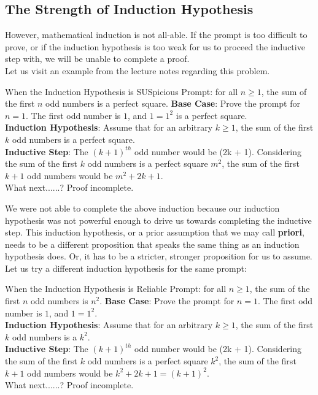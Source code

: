 \subsection{The Strength of Induction Hypothesis}
However, mathematical induction is not all-able. If the prompt is too difficult to prove, or if the induction hypothesis is too weak for us to proceed the inductive step with, we will be unable to complete a proof. \\
Let us visit an example from the lecture notes regarding this problem.
\begin{ln-think}{When the Induction Hypothesis is SUSpicious}{}
    Prompt: for all $n \geq 1$, the sum of the first $n$ odd numbers is a perfect square.
    \tcblower
    \textbf{Base Case}: Prove the prompt for $n = 1$. The first odd number is $1$, and $1 = 1 ^ 2$ is a perfect square. \\
    \textbf{Induction Hypothesis}: Assume that for an arbitrary $k \geq 1$, the sum of the first $k$ odd numbers is a perfect square. \\
    \textbf{Inductive Step}: The $(k + 1)^{th}$ odd number would be (2k + 1). Considering the sum of the first $k$ odd numbers is a perfect square $m^2$, the sum of the first $k + 1$ odd numbers would be $m^2 + 2k + 1$. \\
    What next......? Proof incomplete.
\end{ln-think}
We were not able to complete the above induction because our induction hypothesis was not powerful enough to drive us towards completing the inductive step. This induction hypothesis, or a prior assumption that we may call \textbf{priori}, needs to be a different proposition that speaks the same thing as an induction hypothesis does. Or, it has to be a stricter, stronger proposition for us to assume. \\
Let us try a different induction hypothesis for the same prompt:
\begin{ln-think}{When the Induction Hypothesis is Reliable}{}
    Prompt: for all $n \geq 1$, the sum of the first $n$ odd numbers is $n^2$.
    \tcblower
    \textbf{Base Case}: Prove the prompt for $n = 1$. The first odd number is $1$, and $1 = 1 ^ 2$. \\
    \textbf{Induction Hypothesis}: Assume that for an arbitrary $k \geq 1$, the sum of the first $k$ odd numbers is a $k ^ 2$. \\
    \textbf{Inductive Step}: The $(k + 1)^{th}$ odd number would be (2k + 1). Considering the sum of the first $k$ odd numbers is a perfect square $k^2$, the sum of the first $k + 1$ odd numbers would be $k^2 + 2k + 1 = (k + 1) ^ 2$. \\
    What next......? Proof incomplete.
\end{ln-think}
